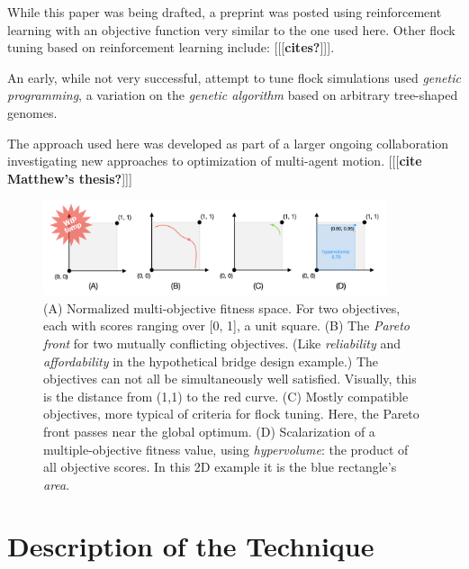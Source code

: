 \documentclass[letterpaper]{article}
\begin{document}
While this paper was being drafted, a preprint was posted \citep{brambati_learning_2025} using reinforcement learning with an objective function very similar to the one used here. Other flock tuning based on reinforcement learning include:
[[[\textbf{cites?}]]].

An early, while not very successful, attempt to tune flock simulations \citep{reynolds_evolved_1993} used \textit{genetic programming}, a variation on the \textit{genetic algorithm} based on arbitrary tree-shaped genomes.

The approach used here was developed as part of a larger ongoing collaboration investigating new approaches to optimization of multi-agent motion. [[[\textbf{cite Matthew's thesis?}]]]


\begin{figure}[t]
    \centering
    \includegraphics[width=0.9\textwidth]{images/temp_MOF_HV.png}
    \caption{(A) Normalized multi-objective fitness space. For two objectives, each with scores ranging over [0, 1], a unit square. (B) The \textit{Pareto front} for two mutually conflicting objectives. (Like \textit{reliability} and \textit{affordability} in the hypothetical bridge design example.) The objectives can not all be simultaneously well satisfied. Visually, this is the distance from (1,1) to the red curve. (C) Mostly compatible objectives, more typical of criteria for flock tuning. Here, the Pareto front passes near the global optimum. (D) Scalarization of a multiple-objective fitness value, using \textit{hypervolume}: the product of all objective scores. In this 2D example it is the blue rectangle's \textit{area}.}
    \label{fig:MOF_HV}
\end{figure}


\section{Description of the Technique}
\label{sec:Description}
\end{document}
